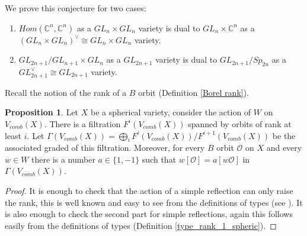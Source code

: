 \documentclass[12pt]{article}
\newcommand{\C}{\mathbb{C}}
\newcommand{\s}{\mathcal{O}}
\theoremstyle{plain}
\theoremstyle{definition}
\newtheorem{prop}[theorem]{Proposition}
\begin{document}
We prove this conjecture for two cases: 

\begin{enumerate}
        \item $Hom(\C^n,\C^n)$ as a $GL_n\times GL_n$ variety is dual to $GL_n\times \C^n$ as a $(GL_n\times GL_n)^\vee\cong GL_n\times GL_n$ variety.
        \item $GL_{2n+1}/GL_{n+1}\times GL_n$ as a $GL_{2n+1}$ variety is dual to $GL_{2n+1}/Sp_{2n}$ as a $GL_{2n+1}^\vee\cong GL_{2n+1}$ variety.
    \end{enumerate}

Recall the notion of the rank of a $B$ orbit (Definition \ref{Borel rank}).

\begin{prop}\label{associated graded}
    Let $X$ be a spherical variety, consider the action of $W$ on $V_{comb}(X)$. There is a filtration $F^i(V_{comb}(X))$ spanned by orbits of rank at least $i$. Let $\Gamma(V_{comb}(X))=\bigoplus_{i} F^{i}(V_{comb}(X))/F^{i+1}(V_{comb}(X))$ be the associated graded of this filtration. Moreover, for every $B$ orbit $\s$ on $X$ and every $w\in W$ there is a number $a\in \{1,-1\}$ such that $w[\s]=a[w\s]$ in $\Gamma(V_{comb}(X))$.
\end{prop}

\begin{proof}
    It is enough to check that the action of a simple reflection can only raise the rank, this is well known and easy to see from the definitions of types (see \cite{knop}). It is also enough to check the second part for simple reflections, again this follows easily from the definitions of types (Definition \ref{type_rank_1_spheric}).
\end{proof}
\end{document}
